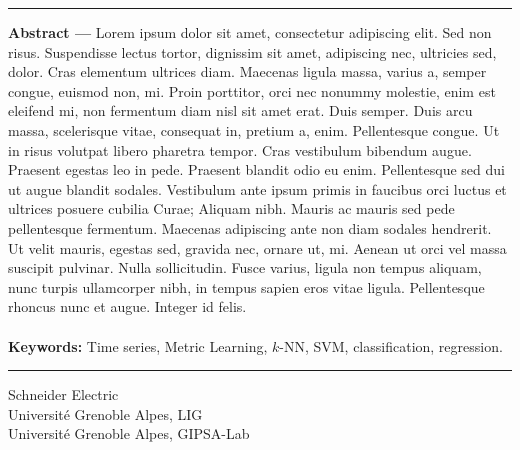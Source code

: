 \begin{vcenterpage}
\noindent\rule[2pt]{\textwidth}{0.5pt}
{\large\textbf{Abstract ---}}
    Lorem ipsum dolor sit amet, consectetur adipiscing elit. Sed non risus. Suspendisse lectus tortor, dignissim sit amet, adipiscing nec, ultricies sed, dolor. Cras elementum ultrices diam. Maecenas ligula massa, varius a, semper congue, euismod non, mi. Proin porttitor, orci nec nonummy molestie, enim est eleifend mi, non fermentum diam nisl sit amet erat. Duis semper. Duis arcu massa, scelerisque vitae, consequat in, pretium a, enim. Pellentesque congue. Ut in risus volutpat libero pharetra tempor. Cras vestibulum bibendum augue. Praesent egestas leo in pede. Praesent blandit odio eu enim. Pellentesque sed dui ut augue blandit sodales. Vestibulum ante ipsum primis in faucibus orci luctus et ultrices posuere cubilia Curae; Aliquam nibh. Mauris ac mauris sed pede pellentesque fermentum. Maecenas adipiscing ante non diam sodales hendrerit. Ut velit mauris, egestas sed, gravida nec, ornare ut, mi. Aenean ut orci vel massa suscipit pulvinar. Nulla sollicitudin. Fusce varius, ligula non tempus aliquam, nunc turpis ullamcorper nibh, in tempus sapien eros vitae ligula. Pellentesque rhoncus nunc et augue. Integer id felis.
\\
\\
{\large\textbf{Keywords:}}
    Time series, Metric Learning, $k$-NN, SVM, classification, regression.
\\
\noindent\rule[2pt]{\textwidth}{0.5pt}
\begin{center}
	Schneider Electric	\\
	Université Grenoble Alpes, LIG\\
	Université Grenoble Alpes, GIPSA-Lab \\
\end{center}
\end{vcenterpage}

